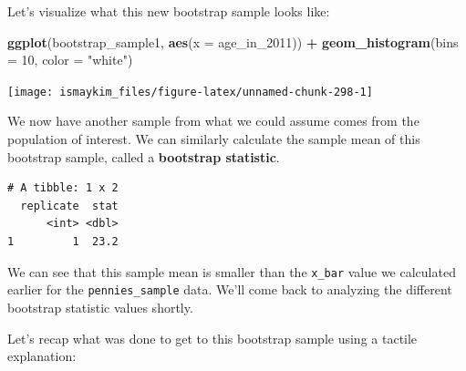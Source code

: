 \documentclass[12pt,]{krantz}
\makeatletter
\newenvironment{Shaded}{\begin{snugshade}}{\end{snugshade}}
\newcommand{\KeywordTok}[1]{\textcolor[rgb]{0.27,0.27,0.27}{\textbf{#1}}}
\newcommand{\DataTypeTok}[1]{\textcolor[rgb]{0.27,0.27,0.27}{#1}}
\newcommand{\DecValTok}[1]{\textcolor[rgb]{0.06,0.06,0.06}{#1}}
\newcommand{\StringTok}[1]{\textcolor[rgb]{0.5,0.5,0.5}{#1}}
\newcommand{\OperatorTok}[1]{\textcolor[rgb]{0.43,0.43,0.43}{\textbf{#1}}}
\newcommand{\NormalTok}[1]{#1}
\newenvironment{kframe}{%
\medskip{}
\setlength{\fboxsep}{.8em}
 \def\at@end@of@kframe{}%
 \ifinner\ifhmode%
  \def\at@end@of@kframe{\end{minipage}}%
  \begin{minipage}{\columnwidth}%
 \fi\fi%
 \def\FrameCommand##1{\hskip\@totalleftmargin \hskip-\fboxsep
 \colorbox{shadecolor}{##1}\hskip-\fboxsep
     \hskip-\linewidth \hskip-\@totalleftmargin \hskip\columnwidth}%
 \MakeFramed {\advance\hsize-\width
   \@totalleftmargin\z@ \linewidth\hsize
   \@setminipage}}%
 {\par\unskip\endMakeFramed%
 \at@end@of@kframe}
\renewenvironment{Shaded}{\begin{kframe}}{\end{kframe}}
\makeatother
\begin{document}
Let's visualize what this new bootstrap sample looks like:

\begin{Shaded}
\begin{Highlighting}[]
\KeywordTok{ggplot}\NormalTok{(bootstrap_sample1, }\KeywordTok{aes}\NormalTok{(}\DataTypeTok{x =}\NormalTok{ age_in_}\DecValTok{2011}\NormalTok{)) }\OperatorTok{+}
\StringTok{  }\KeywordTok{geom_histogram}\NormalTok{(}\DataTypeTok{bins =} \DecValTok{10}\NormalTok{, }\DataTypeTok{color =} \StringTok{"white"}\NormalTok{)}
\end{Highlighting}
\end{Shaded}

\begin{center}\texttt{[image: ismaykim\_files/figure-latex/unnamed-chunk-298-1]} \end{center}

We now have another sample from what we could assume comes from the
population of interest. We can similarly calculate the sample mean of
this bootstrap sample, called a \textbf{bootstrap statistic}.

\begin{Shaded}
\end{Shaded}

\begin{verbatim}
# A tibble: 1 x 2
  replicate  stat
      <int> <dbl>
1         1  23.2
\end{verbatim}

We can see that this sample mean is smaller than the \texttt{x\_bar}
value we calculated earlier for the \texttt{pennies\_sample} data. We'll
come back to analyzing the different bootstrap statistic values shortly.

Let's recap what was done to get to this bootstrap sample using a
tactile explanation:
\end{document}
